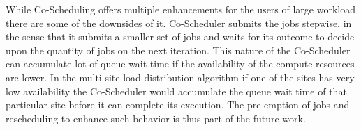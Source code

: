 \documentclass[ms,electronic,double]{nuthesis}
\begin{document}
While Co-Scheduling offers multiple enhancements for the users of large workload 
there are some of the downsides of it. Co-Scheduler submits the jobs stepwise, in 
the sense that it submits a smaller set of jobs and waits for its outcome to decide upon the quantity 
of jobs on the next iteration. This 
nature of the Co-Scheduler can accumulate lot of queue wait time if the availability 
of the compute resources are lower. In the multi-site load distribution 
algorithm if one of the sites has very low availability the Co-Scheduler would 
accumulate the queue wait time of that particular site before it can complete 
its execution. The pre-emption of jobs and rescheduling to enhance such 
behavior is thus part of the future work.

\backmatter

\appendix




\nocite{*}

\end{document}
